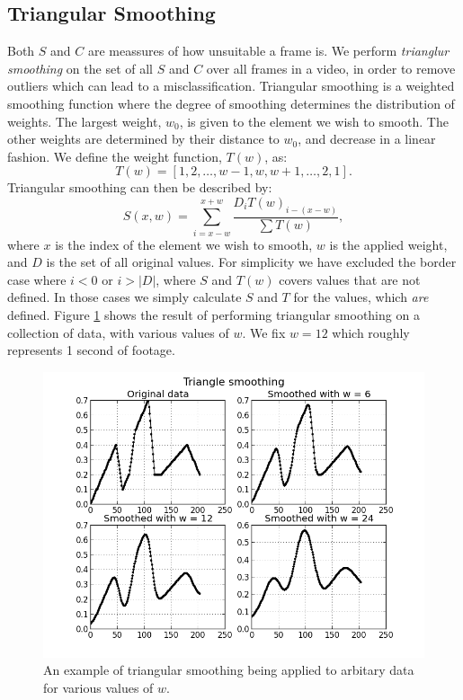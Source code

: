 \subsection{Triangular Smoothing}\label{sec:triangularsmoothing}
%
Both $S$ and $C$ are meassures of how unsuitable a frame is. We perform \textit{trianglur smoothing} on the set of all $S$ and $C$ over all frames in a video, in order to remove outliers which can lead to a misclassification. Triangular smoothing is a weighted smoothing function where the degree of smoothing determines the distribution of weights. The largest weight, $w_0$, is given to the element we wish to smooth. The other weights are determined by their distance to $w_0$, and decrease in a linear fashion. We define the weight function, $T(w)$, as:
%
\begin{equation}
T(w) = [1,2,\dots,w-1,w,w+1,\dots,2,1].
\end{equation}\label{eq:triangular}
%
Triangular smoothing can then be described by:
%
\[
S(x, w) = \sum_{i=x-w}^{x+w} \frac{D_{i} T(w)_{i-(x-w)}}{\sum T(w)},
\]
%
where $x$ is the index of the element we wish to smooth, $w$ is the applied weight, and $D$ is the set of all original values. For simplicity we have excluded the border case where $i < 0$ or $i > |D|$, where $S$ and $T(w)$ covers values that are not defined. In those cases we simply calculate $S$ and $T$ for the values, which \textit{are} defined. Figure \ref{fig:triangularsmoothing} shows the result of performing triangular smoothing on a collection of data, with various values of $w$. We fix $w = 12$ which roughly represents 1 second of footage.
%
\begin{figure}
     \centering
     \includegraphics[width=1\textwidth]{img/triangle_smooth.png}
     \caption{An example of triangular smoothing being applied to arbitary data for various values of $w$.}
     \label{fig:triangularsmoothing}
\end{figure}
%
